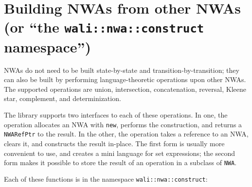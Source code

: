 \section{Building NWAs from other NWAs (or ``the \texttt{wali::nwa::construct} namespace'')}
\label{Se:Building NWAs}

NWAs do not need to be built state-by-state and transition-by-transition;
they can also be built by performing language-theoretic operations upon
other NWAs. The supported operations are union, intersection, concatenation,
reversal, Kleene star, complement, and determinization.

The library supports two interfaces to each of these operations. In one, the
operation allocates an NWA with \texttt{new}, performs the construction, and
returns a \texttt{NWARefPtr} to the result.  In the other, the operation takes
a reference to an NWA, clears it, and constructs the result in-place. The
first form is usually more convenient to use, and creates a mini language for
set expressions; the second form makes it possible to store the result of an
operation in a subclass of \texttt{NWA}.

Each of these functions is in the namespace \texttt{wali::nwa::construct}:

